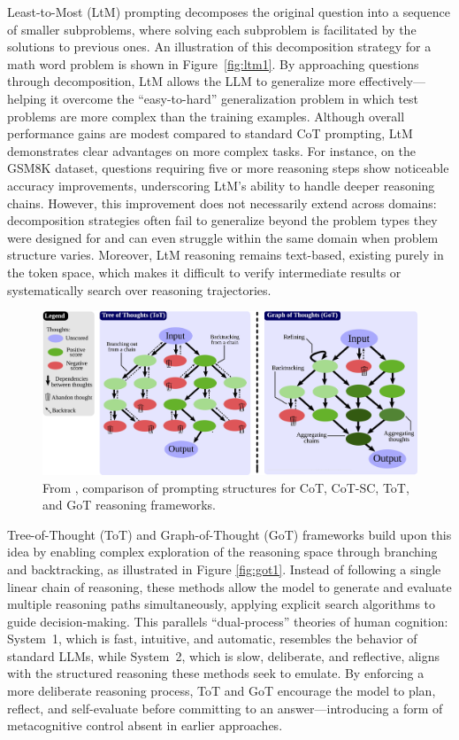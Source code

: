 \documentclass[project]{bsu-cs}  %
\begin{document}
Least-to-Most (LtM) prompting decomposes the original question into a sequence of smaller subproblems, where solving each subproblem is facilitated by the solutions to previous ones. An illustration of this decomposition strategy for a math word problem is shown in Figure~\ref{fig:ltm1}. By approaching questions through decomposition, LtM allows the LLM to generalize more effectively—helping it overcome the ``easy-to-hard'' generalization problem in which test problems are more complex than the training examples. Although overall performance gains are modest compared to standard CoT prompting, LtM demonstrates clear advantages on more complex tasks. For instance, on the GSM8K dataset, questions requiring five or more reasoning steps show noticeable accuracy improvements, underscoring LtM’s ability to handle deeper reasoning chains. However, this improvement does not necessarily extend across domains: decomposition strategies often fail to generalize beyond the problem types they were designed for and can even struggle within the same domain when problem structure varies. Moreover, LtM reasoning remains text-based, existing purely in the token space, which makes it difficult to verify intermediate results or systematically search over reasoning trajectories.

\begin{figure}
    \centering
    \includegraphics[width=0.8\linewidth]{figures/got1.pdf}
    \caption{From \citet{Besta_2024}, comparison of prompting structures for CoT, CoT-SC, ToT, and GoT reasoning frameworks.}
    \label{fig:placeholder}
\end{figure}

Tree-of-Thought (ToT) and Graph-of-Thought (GoT) frameworks build upon this idea by enabling complex exploration of the reasoning space through branching and backtracking, as illustrated in Figure \ref{fig:got1}. Instead of following a single linear chain of reasoning, these methods allow the model to generate and evaluate multiple reasoning paths simultaneously, applying explicit search algorithms to guide decision-making. This parallels ``dual-process'' theories of human cognition: System~1, which is fast, intuitive, and automatic, resembles the behavior of standard LLMs, while System~2, which is slow, deliberate, and reflective, aligns with the structured reasoning these methods seek to emulate. By enforcing a more deliberate reasoning process, ToT and GoT encourage the model to plan, reflect, and self-evaluate before committing to an answer—introducing a form of metacognitive control absent in earlier approaches. 
\end{document}
